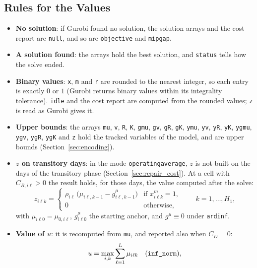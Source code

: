 \documentclass[11pt,a4paper]{article}
\theoremstyle{plain}
\theoremstyle{definition}
\renewcommand{\_}{\textunderscore\allowbreak{}}
\begin{document}
\subsection{Rules for the Values}

\begin{itemize}[nosep,leftmargin=1.5em]
  \item \textbf{No solution}: if Gurobi found no solution, the solution arrays and the cost report are \texttt{null}, and so are \texttt{objective} and \texttt{mip\_gap}.
  \item \textbf{A solution found}: the arrays hold the best solution, and \texttt{status} tells how the solve ended.
  \item \textbf{Binary values}: \texttt{x}, \texttt{m} and \texttt{r} are rounded to the nearest integer, so each entry is exactly $0$ or $1$ (Gurobi returns binary values within its integrality tolerance). \texttt{idle} and the cost report are computed from the rounded values; \texttt{z} is read as Gurobi gives it.
  \item \textbf{Upper bounds}: the arrays \texttt{mu}, \texttt{v}, \texttt{R}, \texttt{K}, \texttt{g\_mu}, \texttt{g\_v}, \texttt{g\_R}, \texttt{g\_K}, \texttt{y\_mu}, \texttt{y\_v}, \texttt{y\_R}, \texttt{y\_K}, \texttt{y\_g\_mu}, \texttt{y\_g\_v}, \texttt{y\_g\_R}, \texttt{y\_g\_K} and \texttt{z} hold the tracked variables of the model, and are upper bounds (Section~\ref{sec:encoding}).
  \item \textbf{$z$ on transitory days}: in the mode \texttt{operating\_average}, $z$ is not built on the days of the transitory phase (Section~\ref{sec:repair_cost}). At a cell with $C_{R,i\ell} > 0$ the result holds, for those days, the value computed after the solve:
  \begin{equation}\label{eq:c_zpost}
    z_{i\ell k} = \begin{cases}
      \rho_{i\ell}\,\bigl(\mu_{i\ell,k-1} - g^{\mu}_{i\ell,k-1}\bigr) & \text{if } x^m_{i\ell k} = 1,\\
      0 & \text{otherwise,}
    \end{cases}
    \qquad k = 1, \ldots, H_1,
  \end{equation}
  with $\mu_{i\ell 0} = \mu_{0,i\ell}$, $g^{\mu}_{i\ell 0}$ the starting anchor, and $g^{\mu} \equiv 0$ under \texttt{ardinf}.
  \item \textbf{Value of $u$}: it is recomputed from \texttt{mu}, and reported also when $C_D = 0$:
  \begin{equation}\label{eq:c_u}
    u = \max_{i,k} \sum_{\ell=1}^{L} \mu_{i\ell k} \quad (\texttt{inf\_norm}),

\end{equation}
\end{itemize}
\end{document}
